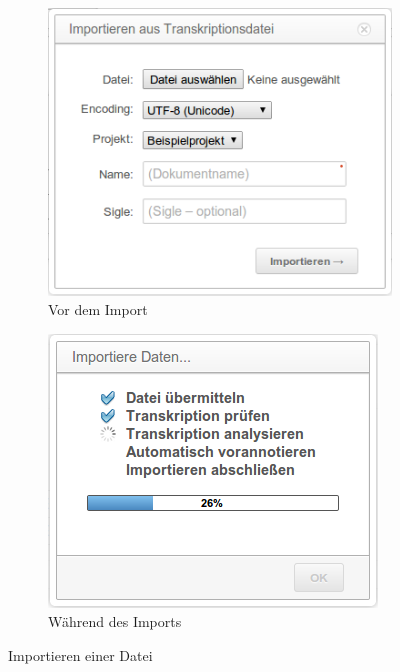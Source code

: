 \documentclass[11pt,a4paper,parskip=half]{scrartcl}
\begin{document}
\begin{figure}
  \centering
  \begin{subfigure}[b]{0.45\textwidth}
    \centering
    \includegraphics[width=\textwidth]{img/import-trans.png}
    \caption{Vor dem Import}
    \label{fig:import-dialog}
  \end{subfigure}
  \hfill
  \begin{subfigure}[b]{0.45\textwidth}
    \centering
    \includegraphics[width=\textwidth]{img/import-trans-progress.png}
    \caption{Während des Imports}
    \label{fig:import-progress}
  \end{subfigure}
  \caption{Importieren einer Datei}
  \label{fig:import}
\end{figure}
\end{document}
